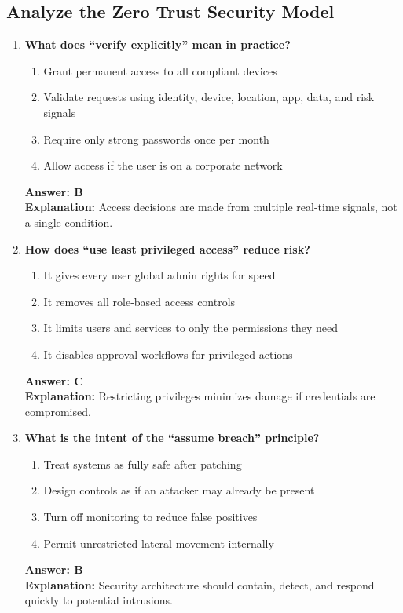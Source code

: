 \documentclass[10pt]{article}
\begin{document}
\clearpage
\subsection{Analyze the Zero Trust Security Model}
\begin{enumerate}[leftmargin=*]


\item \textbf{What does ``verify explicitly'' mean in practice?}
\begin{enumerate}[label=\Alph*.]
  \item Grant permanent access to all compliant devices
  \item Validate requests using identity, device, location, app, data, and risk signals
  \item Require only strong passwords once per month
  \item Allow access if the user is on a corporate network
\end{enumerate}
\textbf{Answer: B}\\
\textbf{Explanation:} Access decisions are made from multiple real-time signals, not a single condition.

\item \textbf{How does ``use least privileged access'' reduce risk?}
\begin{enumerate}[label=\Alph*.]
  \item It gives every user global admin rights for speed
  \item It removes all role-based access controls
  \item It limits users and services to only the permissions they need
  \item It disables approval workflows for privileged actions
\end{enumerate}
\textbf{Answer: C}\\
\textbf{Explanation:} Restricting privileges minimizes damage if credentials are compromised.

\item \textbf{What is the intent of the ``assume breach'' principle?}
\begin{enumerate}[label=\Alph*.]
  \item Treat systems as fully safe after patching
  \item Design controls as if an attacker may already be present
  \item Turn off monitoring to reduce false positives
  \item Permit unrestricted lateral movement internally
\end{enumerate}
\textbf{Answer: B}\\
\textbf{Explanation:} Security architecture should contain, detect, and respond quickly to potential intrusions.


\end{enumerate}
\end{document}
